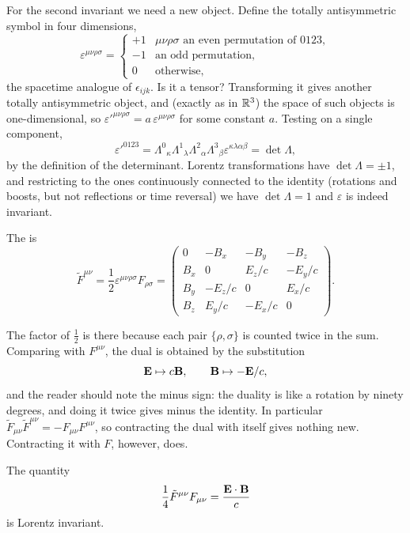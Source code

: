 \documentclass[a4paper]{scrartcl}
\begin{document}
For the second invariant we need a new object. Define the totally antisymmetric symbol in four dimensions,
$$
\varepsilon^{\mu\nu\rho\sigma} = \begin{cases} +1 & \mu\nu\rho\sigma \text{ an even permutation of } 0123,\\ -1 & \text{an odd permutation},\\ 0&\text{otherwise},\end{cases}
$$
the spacetime analogue of $\epsilon_{ijk}$. Is it a tensor? Transforming it gives another totally antisymmetric object, and (exactly as in $\mathbb{R}^3$) the space of such objects is one-dimensional, so $\varepsilon'^{\mu\nu\rho\sigma} = a\,\varepsilon^{\mu\nu\rho\sigma}$ for some constant $a$. Testing on a single component,
$$
\varepsilon'^{0123} = \Lambda^0{}_\kappa \Lambda^1{}_\lambda\Lambda^2{}_\alpha\Lambda^3{}_\beta \varepsilon^{\kappa\lambda\alpha\beta} = \det \Lambda,
$$
by the definition of the determinant. Lorentz transformations have $\det\Lambda = \pm 1$, and restricting to the ones continuously connected to the identity (rotations and boosts, but not reflections or time reversal) we have $\det\Lambda = 1$ and $\varepsilon$ is indeed invariant.

\begin{definition}
	The  is
	$$
	\tilde F^{\mu\nu} = \frac{1}{2}\varepsilon^{\mu\nu\rho\sigma}F_{\rho\sigma} = \begin{pmatrix} 0 & -B_x & -B_y & -B_z\\ B_x & 0 & E_z/c & -E_y/c\\ B_y & -E_z/c & 0 & E_x/c\\ B_z & E_y/c & -E_x/c & 0\end{pmatrix}.
	$$
\end{definition}

The factor of $\tfrac12$ is there because each pair $\{\rho,\sigma\}$ is counted twice in the sum. Comparing with $F^{\mu\nu}$, the dual is obtained by the substitution
$$
\mathbf{E} \mapsto c\mathbf{B}, \qquad \mathbf{B}\mapsto -\mathbf{E}/c,
$$
and the reader should note the minus sign: the duality is like a rotation by ninety degrees, and doing it twice gives minus the identity. In particular $\tilde F_{\mu\nu}\tilde F^{\mu\nu} = -F_{\mu\nu}F^{\mu\nu}$, so contracting the dual with itself gives nothing new. Contracting it with $F$, however, does.

\begin{proposition}
	The quantity
	$$
	\frac{1}{4}\tilde F^{\mu\nu}F_{\mu\nu} = \frac{\mathbf{E}\cdot\mathbf{B}}{c}
	$$
	is Lorentz invariant.
\end{proposition}
\end{document}
